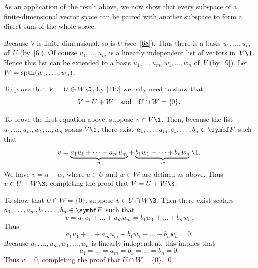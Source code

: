 As an application of the result above, we now show that every
subspace of a finite-dimensional vector space can be paired with another
subspace to form a direct sum of the whole space.


\proof
Because $V$ is finite-dimensional, so is $U$ (see~\ref{68}).  Thus there is a basis
$u_1, \dots, u_m$ of~$U$ (by~\ref{6}).  Of course $u_1, \dots, u_m$ is a
linearly independent list of vectors in~$V\1$. Hence this list can be extended to a
basis $u_1, \dots, u_m, w_1, \dots, w_n$ of~$V$ (by~\ref{9}).  Let
$W = \operatorname{span}(w_1, \dots, w_n)$.

To prove that $V = U \oplus W\3$, by \ref{219} we only need to show that
\[
V = U + W \quad \text{and} \quad U \cap W = \{0\}.
\]

To prove the first equation above, suppose $v \in V\1$.  Then,  because the list $u_1, \dots, u_m, w_1, \dots, w_n$ spans $V\1$,
there exist $a_1, \dots, a_m, b_1, \dots, b_n \in \F{}$ such that
\vspace{-.05in} %
\[
v = \underbrace{a_1 u_1 + \dots + a_m u_m}_u +
\underbrace{b_1 w_1 + \dots + b_n w_n}_w\1.
\]
We have $v = u + w$, where $u \in U$ and $w \in W$ are defined
as above.  Thus
$v \in U + W\3$, completing the proof that $V = U + W\3$.

To show that $U \cap W = \{0\}$, suppose
$v \in U \cap W\3$.  Then there exist scalars
$a_1, \dots, a_m, b_1, \dots, b_n \in \F{}$ such that
\[
v = a_1 u_1 + \dots + a_m u_m = b_1 w_1 + \dots + b_n w_n.
\]
Thus
\[
a_1 u_1 + \dots + a_m u_m - b_1 w_1 - \dots - b_n w_n = 0.
\]
Because $u_1, \dots, u_m, w_1, \dots, w_n$ is linearly independent, this
implies that
\[
a_1 = \dots = a_m = b_1 = \dots = b_n = 0.
\]
Thus $v = 0$,
completing the proof that $U \cap W = \{0\}$.
\qed

